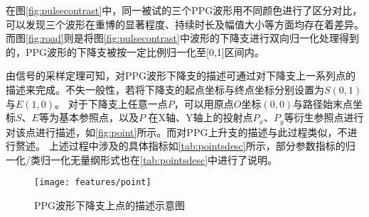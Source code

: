 在图\autoref{fig:pulsecontrast}中，同一被试的三个PPG波形用不同颜色进行了区分对比，可以发现三个波形在重博的显著程度、持续时长及幅值大小等方面均存在着差异。
而图\autoref{fig:road}则是将图\autoref{fig:pulsecontrast}中波形的下降支进行双向归一化处理得到的，PPG波形的下降支被按一定比例归一化至[0,1]区间内。

由信号的采样定理可知，对PPG波形下降支的描述可通过对下降支上一系列点的描述来完成。不失一般性，若将下降支的起点坐标与终点坐标分别设置为$S$$(0,1)$与$E$$(1,0)$。
对于下降支上任意一点$P$，可以用原点$O$坐标$(0,0)$与路径始末点坐标$S$、$E$等为基本参照点，以及$P$
在X轴、Y轴上的投射点$P_x$、$P_y$等衍生参照点进行对该点进行描述，如\autoref{fig:point}所示。而对PPG上升支的描述与此过程类似，不进行赘述。
上述过程中涉及的具体指标如\autoref{tab:pointsdesc}所示，部分参数指标的归一化/类归一化无量纲形式也在\autoref{tab:pointsdesc}中进行了说明。

\begin{figure}[htbp]
  \centering
  \texttt{[image: features/point]}
  \caption{\label{fig:point}PPG波形下降支上点的描述示意图}
\end{figure}

